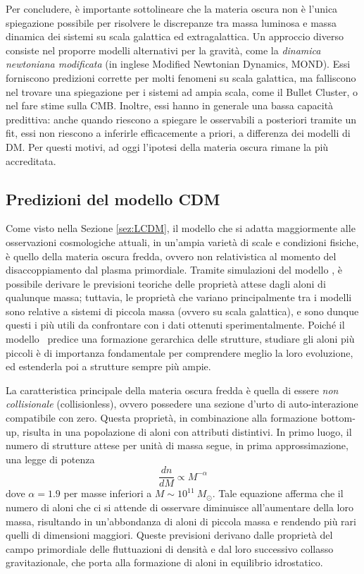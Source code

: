 Per concludere, è importante sottolineare che la materia oscura non è l'unica spiegazione possibile per risolvere le discrepanze tra massa luminosa e massa dinamica dei sistemi su scala galattica ed extragalattica. Un approccio diverso consiste nel proporre modelli alternativi per la gravità, come la \emph{dinamica newtoniana modificata} (in inglese Modified Newtonian Dynamics, MOND). Essi forniscono predizioni corrette per molti fenomeni su scala galattica, ma falliscono nel trovare una spiegazione per i sistemi ad ampia scala, come il Bullet Cluster, o nel fare stime sulla CMB. 
Inoltre, essi hanno in generale una bassa capacità predittiva: anche quando riescono a spiegare le osservabili a posteriori tramite un fit, essi non riescono a inferirle efficacemente a priori, a differenza dei modelli di DM. Per questi motivi, ad oggi l'ipotesi della materia oscura rimane la più accreditata.

\subsection{Predizioni del modello CDM}
\label{sez:LCDM_predictions}

Come visto nella Sezione \ref{sez:LCDM}, il modello che si adatta maggiormente alle osservazioni cosmologiche attuali, in un'ampia varietà di scale e condizioni fisiche, è quello della materia oscura fredda, ovvero non relativistica al momento del disaccoppiamento dal plasma primordiale. Tramite simulazioni del modello \LCDM, è possibile derivare le previsioni teoriche delle proprietà attese dagli aloni di qualunque massa; tuttavia, le proprietà che variano principalmente tra i modelli  sono relative a sistemi di piccola massa (ovvero su scala galattica), e sono dunque questi i più utili da confrontare con i dati ottenuti sperimentalmente. Poiché il modello \LCDM\ predice una formazione gerarchica delle strutture, studiare gli aloni più piccoli è di importanza fondamentale per comprendere meglio la loro evoluzione, ed estenderla poi a strutture sempre più ampie.

La caratteristica principale della materia oscura fredda è quella di essere \emph{non collisionale} (collisionless), ovvero possedere una sezione d'urto di auto-interazione compatibile con zero. Questa proprietà, in combinazione alla formazione bottom-up, risulta in una popolazione di aloni con attributi distintivi.
In primo luogo, il numero di strutture attese per unità di massa segue, in prima approssimazione, una legge di potenza \parencite{Vegetti2024}
\begin{equation}
    \frac{dn}{dM} \propto M^{-\alpha}
    \label{eq:dn/dM}
\end{equation}
dove $\alpha=1.9$ per masse inferiori a $M\sim10^{11}\ M_\odot$. Tale equazione afferma che il numero di aloni che ci si attende di osservare diminuisce all'aumentare della loro massa, risultando in un'abbondanza di aloni di piccola massa e rendendo più rari quelli di dimensioni maggiori.
Queste previsioni derivano dalle proprietà del campo primordiale delle fluttuazioni di densità e dal loro successivo collasso gravitazionale, che porta alla formazione di aloni in equilibrio idrostatico.

